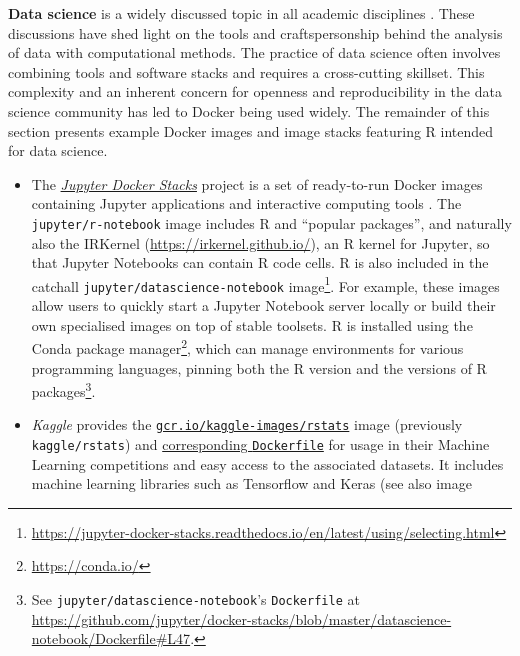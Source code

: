 \label{datascience} \textbf{Data science} is a widely discussed topic in
all academic disciplines \citep[e.g.,][]{donoho_50_2017}. These
discussions have shed light on the tools and craftspersonship behind the
analysis of data with computational methods. The practice of data
science often involves combining tools and software stacks and requires
a cross-cutting skillset. This complexity and an inherent concern for
openness and reproducibility in the data science community has led to
Docker being used widely. The remainder of this section presents example
Docker images and image stacks featuring R intended for data science.

\begin{itemize}
\tightlist
\item
  The \href{https://github.com/jupyter/docker-stacks/}{\emph{Jupyter
  Docker Stacks}} project is a set of ready-to-run Docker images
  containing Jupyter applications and interactive computing tools
  \citep{project_jupyter_jupyter_2018}. The \texttt{jupyter/r-notebook}
  image includes R and ``popular packages'', and naturally also the
  IRKernel (\url{https://irkernel.github.io/}), an R kernel for Jupyter,
  so that Jupyter Notebooks can contain R code cells. R is also included
  in the catchall \texttt{jupyter/datascience-notebook}
  image\footnote{\href{https://jupyter-docker-stacks.readthedocs.io/en/latest/using/selecting.html}{https://jupyter-docker-stacks.readthedocs.io/en/latest/using/selecting.html}}.
  For example, these images allow users to quickly start a Jupyter
  Notebook server locally or build their own specialised images on top
  of stable toolsets. R is installed using the Conda package
  manager\footnote{\href{https://conda.io/}{https://conda.io/}}, which
  can manage environments for various programming languages, pinning
  both the R version and the versions of R
  packages\footnote{See \texttt{jupyter/datascience-notebook}'s \texttt{Dockerfile} at \href{https://github.com/jupyter/docker-stacks/blob/master/datascience-notebook/Dockerfile\#L47}{https://github.com/jupyter/docker-stacks/blob/master/datascience-notebook/Dockerfile\#L47}.}.
\item
  \emph{Kaggle} provides the
  \href{https://hub.docker.com/r/kaggle/rstats}{\texttt{gcr.io/kaggle-images/rstats}}
  image (previously \texttt{kaggle/rstats}) and
  \href{https://github.com/Kaggle/docker-rstats}{corresponding
  \texttt{Dockerfile}} for usage in their Machine Learning competitions
  and easy access to the associated datasets. It includes machine
  learning libraries such as Tensorflow and Keras (see also image

\end{itemize}
